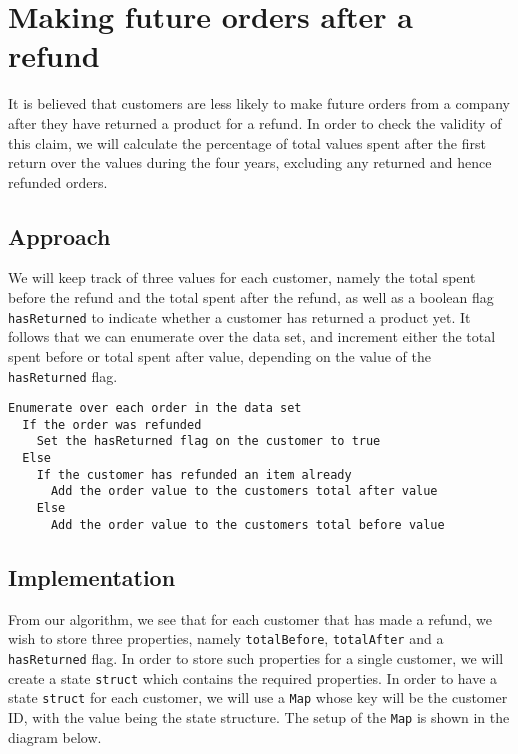 \newpage
\section{Making future orders after a refund}
It is believed that customers are less likely to make future orders from a company after they have returned a product for a refund. In order to check the validity of this claim, we will calculate the percentage of total values spent after the first return over the values during the four years, excluding any returned and hence refunded orders.

\subsection{Approach}
We will keep track of three values for each customer, namely the total spent before the refund and the total spent after the refund, as well as a boolean flag \lstinline|hasReturned| to indicate whether a customer has returned a product yet. It follows that we can enumerate over the data set, and increment either the total spent before or total spent after value, depending on the value of the \lstinline|hasReturned| flag.

\begin{lstlisting}[language=none]
Enumerate over each order in the data set
  If the order was refunded
    Set the hasReturned flag on the customer to true
  Else
    If the customer has refunded an item already
      Add the order value to the customers total after value
    Else
      Add the order value to the customers total before value
\end{lstlisting}

\subsection{Implementation}
From our algorithm, we see that for each customer that has made a refund, we wish to store three properties, namely \lstinline|totalBefore|, \lstinline|totalAfter| and a \lstinline|hasReturned| flag. In order to store such properties for a single customer, we will create a state \lstinline|struct| which contains the required properties. In order to have a state \lstinline|struct| for each customer, we will use a \lstinline|Map| whose key will be the customer ID, with the value being the state structure. The setup of the \lstinline|Map| is shown in the diagram below.


